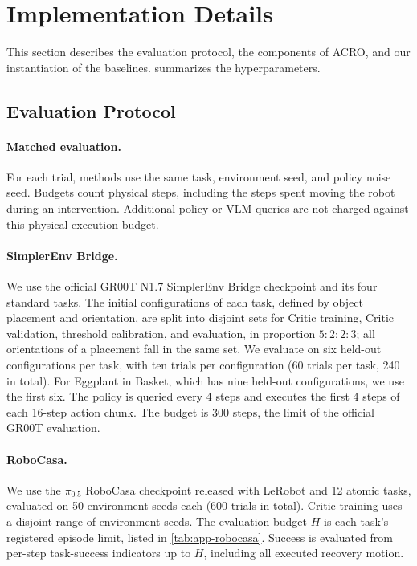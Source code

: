 \section{Implementation Details}
\label{app:details}

This section describes the evaluation protocol, the components of ACRO, and our instantiation of the baselines.  summarizes the hyperparameters.

\subsection{Evaluation Protocol}
\label{app:protocol}

\paragraph{Matched evaluation.}
For each trial, methods use the same task, environment seed, and policy noise seed. Budgets count physical steps, including the steps spent moving the robot during an intervention. Additional policy or VLM queries are not charged against this physical execution budget.

\paragraph{SimplerEnv Bridge.}
We use the official GR00T N1.7 SimplerEnv Bridge checkpoint and its four standard tasks. The initial configurations of each task, defined by object placement and orientation, are split into disjoint sets for Critic training, Critic validation, threshold calibration, and evaluation, in proportion $5{:}2{:}2{:}3$; all orientations of a placement fall in the same set. We evaluate on six held-out configurations per task, with ten trials per configuration (60 trials per task, 240 in total). For Eggplant in Basket, which has nine held-out configurations, we use the first six. The policy is queried every 4 steps and executes the first 4 steps of each 16-step action chunk. The budget is 300 steps, the limit of the official GR00T evaluation.

\paragraph{RoboCasa.}
We use the $\pi_{0.5}$ RoboCasa checkpoint released with LeRobot and 12 atomic tasks, evaluated on 50 environment seeds each (600 trials in total). Critic training uses a disjoint range of environment seeds. The evaluation budget $H$ is each task's registered episode limit, listed in \cref{tab:app-robocasa}. Success is evaluated from per-step task-success indicators up to $H$, including all executed recovery motion.

